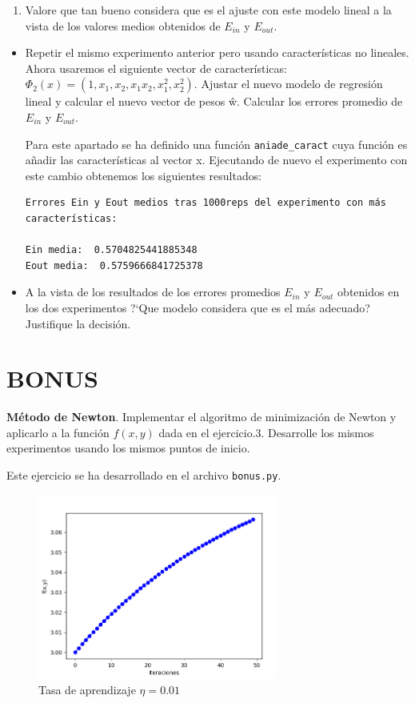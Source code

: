 \documentclass[size=a4, parskip=half, titlepage=false, toc=flat, toc=bib, 12pt]{scrartcl}
\begin{document}
\begin{enumerate}
\begin{enumerate}
\item Valore que tan bueno considera que es el ajuste con este modelo lineal a la vista
de los valores medios obtenidos de $E_{in}$ y $E_{out}$.
\end{enumerate}
\begin{itemize}
\item Repetir el mismo experimento anterior pero usando características no lineales. Ahora
usaremos el siguiente vector de características: $\Phi_2 (x) = (1, x_1 , x_2 , x_1 x_2 , x^2_1 , x_2^2 )$. Ajustar
el nuevo modelo de regresión lineal y calcular el nuevo vector de pesos ŵ. Calcular
los errores promedio de $E_{in}$ y $E _{out}$.

Para este apartado se ha definido una función \verb|aniade_caract| cuya función es añadir
las características al vector x. Ejecutando de nuevo el experimento con este cambio obtenemos
los siguientes resultados:

\begin{lstlisting}
Errores Ein y Eout medios tras 1000reps del experimento con más características:

Ein media:  0.5704825441885348
Eout media:  0.5759666841725378
\end{lstlisting}

\item A la vista de los resultados de los errores promedios $E_{in}$ y $E_{out}$ obtenidos en los dos
experimentos ?`Que modelo considera que es el más adecuado? Justifique la decisión.

\end{itemize}
\end{enumerate}

\section{BONUS}

\textbf{Método de Newton}. Implementar el algoritmo de minimización de Newton
y aplicarlo a la función $f (x, y)$ dada en el ejercicio.3. Desarrolle los mismos experimentos
usando los mismos puntos de inicio.

Este ejercicio se ha desarrollado en el archivo \verb|bonus.py|.

\begin{figure}[H]
\centering
\includegraphics[width=0.7\textwidth]{./img/bonus21}
\caption{Tasa de aprendizaje $\eta = 0.01$}
\end{figure}
\end{document}
